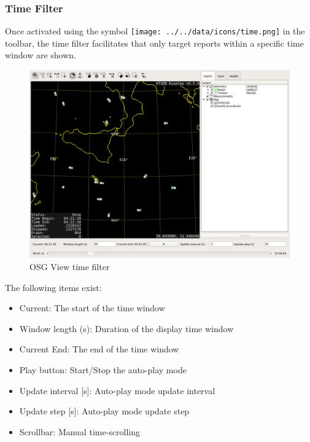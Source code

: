 \subsubsection{Time Filter}

Once activated using the symbol \texttt{[image: ../../data/icons/time.png]} in the toolbar, the time filter facilitates that only target reports within a specific time window are shown.


\begin{figure}[H]
    \hspace*{-2.5cm}
    \includegraphics[width=19cm,frame]{figures/osgview_time_filter.png}
  \caption{OSG View time filter}
  \label{fig:osgview_time_filter}
\end{figure}

The following items exist:

\begin{itemize}
 \item Current: The start of the time window
 \item Window length (s): Duration of the display time window
 \item Current End: The end of the time window
 \item Play button: Start/Stop the auto-play mode
 \item Update interval [s]: Auto-play mode update interval
 \item Update step [s]: Auto-play mode update step
 \item Scrollbar: Manual time-scrolling
\end{itemize}
\ \\

